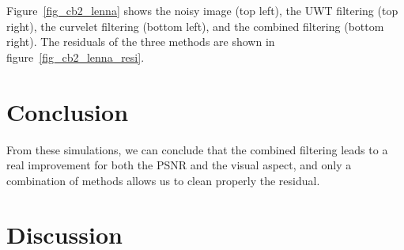 \documentclass[11pt,draft]{IEEEtran} %
\begin{document}
Figure~\ref{fig_cb2_lenna} shows the noisy image (top left), the 
UWT filtering (top right), the curvelet filtering (bottom left), and
the combined filtering (bottom right). The residuals of the three 
methods are shown in figure~\ref{fig_cb2_lenna_resi}.


\section{Conclusion}
From these simulations, we can conclude that the combined filtering 
leads to a real improvement for both the PSNR and the visual aspect, and
only a combination of methods allows us to clean properly the residual.

\section{Discussion}


\begin{appendix}

\end{appendix}

\nocite{*}

\end{document}
